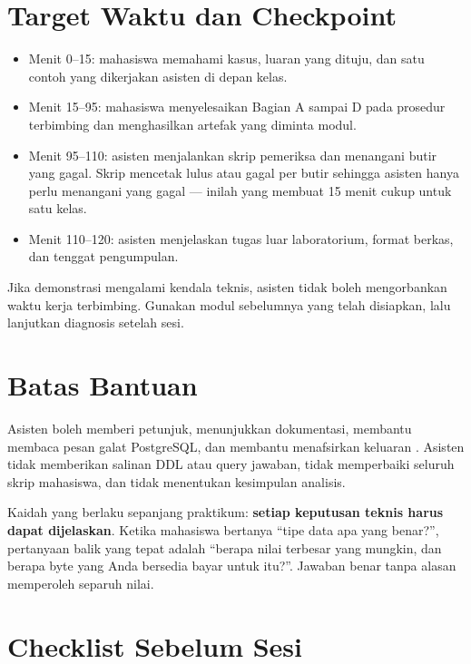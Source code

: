\section{Target Waktu dan Checkpoint}

\begin{itemize}
  \item Menit 0--15: mahasiswa memahami kasus, luaran yang dituju, dan satu
        contoh yang dikerjakan asisten di depan kelas.
  \item Menit 15--95: mahasiswa menyelesaikan Bagian A sampai D pada prosedur
        terbimbing dan menghasilkan artefak yang diminta modul.
  \item Menit 95--110: asisten menjalankan skrip pemeriksa dan menangani butir
        yang gagal. Skrip mencetak lulus atau gagal per butir sehingga asisten
        hanya perlu menangani yang gagal --- inilah yang membuat 15 menit cukup
        untuk satu kelas.
  \item Menit 110--120: asisten menjelaskan tugas luar laboratorium, format
        berkas, dan tenggat pengumpulan.
\end{itemize}

Jika demonstrasi mengalami kendala teknis, asisten tidak boleh mengorbankan
waktu kerja terbimbing. Gunakan  modul sebelumnya yang
telah disiapkan, lalu lanjutkan diagnosis setelah sesi.

\section{Batas Bantuan}

Asisten boleh memberi petunjuk, menunjukkan dokumentasi, membantu membaca pesan
galat PostgreSQL, dan membantu menafsirkan keluaran . Asisten
tidak memberikan salinan DDL atau query jawaban, tidak memperbaiki seluruh
skrip mahasiswa, dan tidak menentukan kesimpulan analisis.

\begin{catatanasisten}
Kaidah yang berlaku sepanjang praktikum: \textbf{setiap keputusan teknis harus
dapat dijelaskan}. Ketika mahasiswa bertanya ``tipe data apa yang benar?'',
pertanyaan balik yang tepat adalah ``berapa nilai terbesar yang mungkin, dan
berapa byte yang Anda bersedia bayar untuk itu?''. Jawaban benar tanpa alasan
memperoleh separuh nilai.
\end{catatanasisten}

\section{Checklist Sebelum Sesi}

